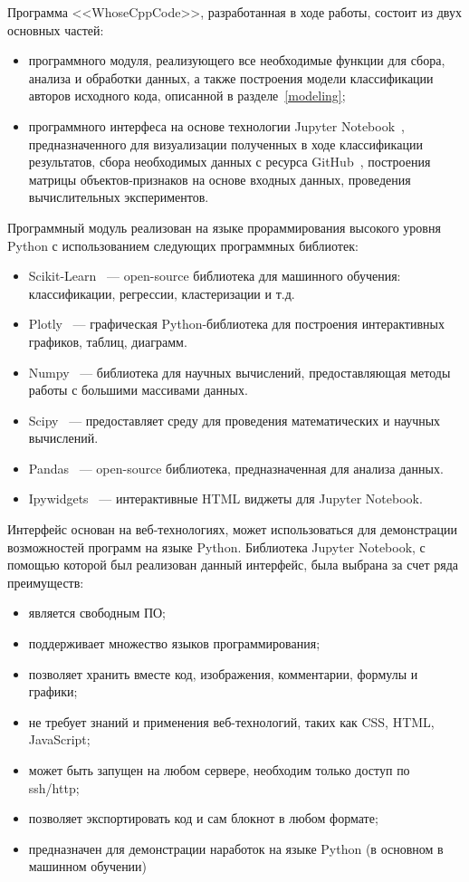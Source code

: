 Программа <<WhoseCppCode>>, разработанная в ходе работы, состоит из двух основных частей:
\begin{itemize}
 \item программного модуля, реализующего все необходимые функции для сбора, анализа и обработки данных, 
а также построения модели классификации авторов исходного кода, описанной в разделе~\ref{modeling};
 \item программного интерфеса на основе технологии Jupyter Notebook~\cite{jupyter}, предназначенного 
 для визуализации полученных в ходе классификации результатов, сбора необходимых данных с ресурса GitHub~\cite{GitHub},
 построения матрицы объектов-признаков на основе входных данных, проведения вычислительных экспериментов.
\end{itemize}

Программный модуль реализован на языке прораммирования высокого уровня Python с использованием следующих 
программных библиотек:
\begin{itemize}
 \item Scikit-Learn~\cite{scikit} --- open-source библиотека для машинного обучения: классификации, регрессии, кластеризации и т.д.
 \item Plotly~\cite{plotly} --- графическая Python-библиотека для построения интерактивных графиков, таблиц, диаграмм.
 \item Numpy~\cite{numpy} --- библиотека для научных вычислений, предоставляющая методы работы с большими массивами данных.
 \item Scipy~\cite{scipy} --- предоставляет среду для проведения математических и научных вычислений.
 \item Pandas~\cite{pandas} --- open-source библиотека, предназначенная для анализа данных.
 \item Ipywidgets~\cite{widgets} --- интерактивные HTML виджеты для Jupyter Notebook.
\end{itemize}

Интерфейс основан на веб-технологиях, может использоваться для демонстрации возможностей
программ на языке Python. Библиотека Jupyter Notebook, с помощью которой был реализован
данный интерфейс, была выбрана за счет ряда преимуществ:
\begin{itemize}
 \item является свободным ПО;
 \item поддерживает множество языков программирования;
 \item позволяет хранить вместе код, изображения, комментарии, формулы и графики;
 \item не требует знаний и применения веб-технологий, таких как CSS, HTML, JavaScript;
 \item может быть запущен на любом сервере, необходим только доступ по ssh/http;
 \item позволяет экспортировать код и сам блокнот в любом формате;
 \item предназначен для демонстрации наработок на языке Python (в основном в машинном обучении)
\end{itemize}

